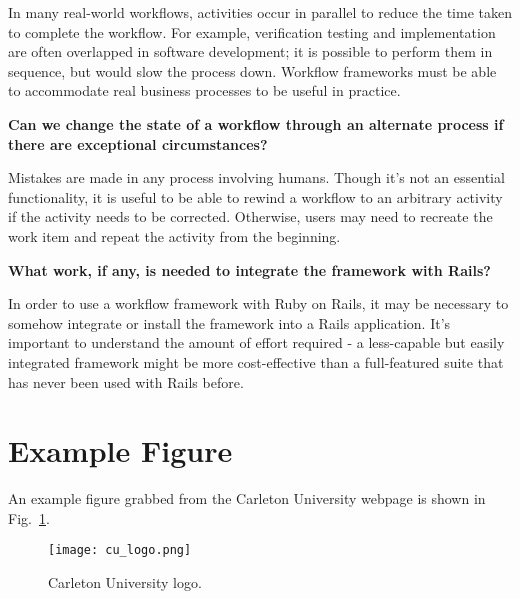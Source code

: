 \documentclass[12pt]{report}
\newcommand{\question}[1] {\vspace{3mm} \noindent \textbf{#1}}
\begin{document}
In many real-world workflows, activities occur in parallel to reduce the time taken to complete the workflow. For example, verification testing and implementation are often overlapped in software development; it is possible to perform them in sequence, but would slow the process down. Workflow frameworks must be able to accommodate real business processes to be useful in practice.

\question{Can we change the state of a workflow through an alternate process if there are exceptional circumstances?}

Mistakes are made in any process involving humans. Though it’s not an essential functionality, it is useful to be able to rewind a workflow to an arbitrary activity if the activity needs to be corrected. Otherwise, users may need to recreate the work item and repeat the activity from the beginning.

\question{What work, if any, is needed to integrate the framework with Rails?}

In order to use a workflow framework with Ruby on Rails, it may be necessary to somehow integrate or install the framework into a Rails application. It’s important to understand the amount of effort required - a less-capable but easily integrated framework might be more cost-effective than a full-featured suite that has never been used with Rails before.



\section{Example Figure}

An example figure grabbed from the Carleton University webpage is shown in Fig.~\ref{fig-culogo}.
  \begin{figure}[hbt]
   \begin{center}
     \texttt{[image: cu\_logo.png]}
   \end{center}
  \caption{Carleton University logo.}
  \label{fig-culogo}
  \end{figure}
  

\end{document}
